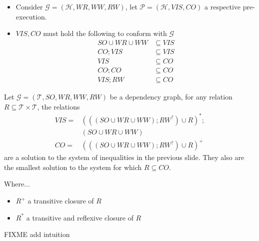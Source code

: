 \documentclass{beamer}
\begin{document}
\begin{frame}
	\begin{itemize}
		\item Consider $\mathcal{G} = (\mathcal{H}, WR, WW, RW)$, let $\mathcal{P} = (\mathcal{H}, VIS, CO)$ a respective pre-execution.
		\item $VIS,CO$ must hold the following to conform with $\mathcal{G}$ \\
			\begin{align*}
				SO \cup WR \cup WW & \subseteq VIS \\
				CO; VIS & \subseteq VIS \\
				VIS & \subseteq CO \\
				CO; CO & \subseteq CO \\
				VIS; RW & \subseteq CO
			\end{align*}
	\end{itemize}
\end{frame}

\begin{frame}
	\begin{lemma}
		Let $\mathcal{G} = (\mathcal{T}, SO, WR, WW, RW)$ be a dependency graph, for any relation $R \subseteq \mathcal{T} \times \mathcal{T}$, the relations
		$$
			\begin{aligned}
				VIS = {} & (((SO \cup WR \cup WW); RW^?) \cup R)^*; \\
				         & (SO \cup WR \cup WW) \\
				 CO = {} & (((SO \cup WR \cup WW); RW^?) \cup R)^+
			\end{aligned}
		$$
		are a solution to the system of inequalities in the previous slide. They also are the smallest solution to the system for which $R \subseteq CO$.
	\end{lemma}
	Where... 
	\begin{itemize}
		\item $R^+$ a transitive closure of $R$
		\item $R^*$ a transitive and reflexive closure of $R$
	\end{itemize}
\end{frame}

\begin{frame}
	FIXME add intuition
\end{frame}
\end{document}
